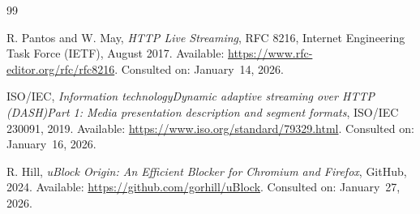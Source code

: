 \documentclass[12pt,a4paper,twoside]{report}
\newif\ifmainpagination
\begin{document}
\begin{thebibliography}{99}

R. Pantos and W. May,
\emph{HTTP Live Streaming}, RFC 8216,
Internet Engineering Task Force (IETF), August 2017.
Available: \url{https://www.rfc-editor.org/rfc/rfc8216}. Consulted on: January~14, 2026.

ISO/IEC,
\emph{Information technology\textemdash{}Dynamic adaptive streaming over HTTP (DASH)\textemdash{}Part 1:
Media presentation description and segment formats}, ISO/IEC 23009\textendash{}1,
2019.
Available: \url{https://www.iso.org/standard/79329.html}. Consulted on: January~16, 2026.


R. Hill,
\emph{uBlock Origin: An Efficient Blocker for Chromium and Firefox},
GitHub, 2024.
Available: \url{https://github.com/gorhill/uBlock}. Consulted on: January~27, 2026.

\end{thebibliography}
\endgroup

\label{LastMainPage}
\clearpage
\mainpaginationfalse
\hypersetup{pageanchor=false}


\iffalse
\clearpage
\thispagestyle{empty}
\end{document}
